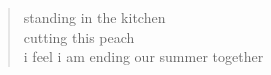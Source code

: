 
\begin{verse}
standing in the kitchen \\
cutting this peach \\
i feel i am ending our summer together
\end{verse}
